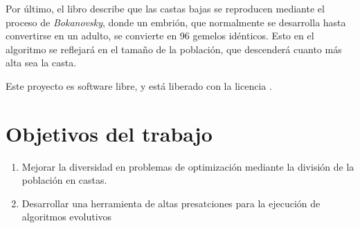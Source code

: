 Por último, el libro describe que las castas bajas se reproducen mediante el proceso de \textit{Bokanovsky}, donde un embrión, que normalmente se desarrolla hasta convertirse
en un adulto, se convierte en 96 gemelos idénticos. Esto en el algoritmo se reflejará en el tamaño de la población, que descenderá cuanto más alta sea la casta.


Este proyecto es software libre, y está liberado con la licencia \cite{gplv3}.

\section{Objetivos del trabajo}

\begin{enumerate}
    \item Mejorar la diversidad en problemas de optimización mediante la división de la población en castas.
    \item Desarrollar una herramienta de altas presatciones para la ejecución de algoritmos evolutivos
\end{enumerate}